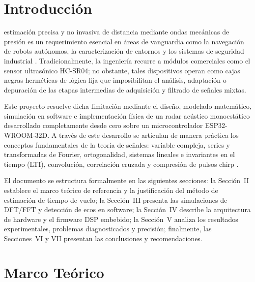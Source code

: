 \documentclass[journal]{IEEEtran}
\begin{document}
\maketitle
\IEEEdisplaynontitleabstractindextext
\IEEEpeerreviewmaketitle

\section{Introducci\'on}
 estimaci\'on precisa y no invasiva de distancia mediante ondas mec\'anicas de presi\'on es un requerimiento esencial en \'areas de vanguardia como la navegaci\'on de robots aut\'onomos, la caracterizaci\'on de entornos y los sistemas de seguridad industrial \cite{Oppenheim2010}. Tradicionalmente, la ingenier\'ia recurre a m\'odulos comerciales como el sensor ultras\'onico HC-SR04; no obstante, tales dispositivos operan como cajas negras herm\'eticas de l\'ogica fija que imposibilitan el an\'alisis, adaptaci\'on o depuraci\'on de las etapas intermedias de adquisici\'on y filtrado de se\~nales mixtas.

Este proyecto resuelve dicha limitaci\'on mediante el dise\~no, modelado matem\'atico, simulaci\'on en software e implementaci\'on f\'isica de un radar ac\'ustico monoest\'atico desarrollado completamente desde cero sobre un microcontrolador ESP32-WROOM-32D. A trav\'es de este desarrollo se articulan de manera pr\'actica los conceptos fundamentales de la teor\'ia de se\~nales: variable compleja, series y transformadas de Fourier, ortogonalidad, sistemas lineales e invariantes en el tiempo (LTI), convoluci\'on, correlaci\'on cruzada y compresi\'on de pulsos chirp \cite{Proakis2007}.

El documento se estructura formalmente en las siguientes secciones: la Secci\'on~II establece el marco te\'orico de referencia y la justificaci\'on del m\'etodo de estimaci\'on de tiempo de vuelo; la Secci\'on~III presenta las simulaciones de DFT/FFT y detecci\'on de ecos en software; la Secci\'on~IV describe la arquitectura de hardware y el firmware DSP embebido; la Secci\'on~V analiza los resultados experimentales, problemas diagnosticados y precisi\'on; finalmente, las Secciones~VI y VII presentan las conclusiones y recomendaciones.

\section{Marco Te\'orico}
\end{document}
